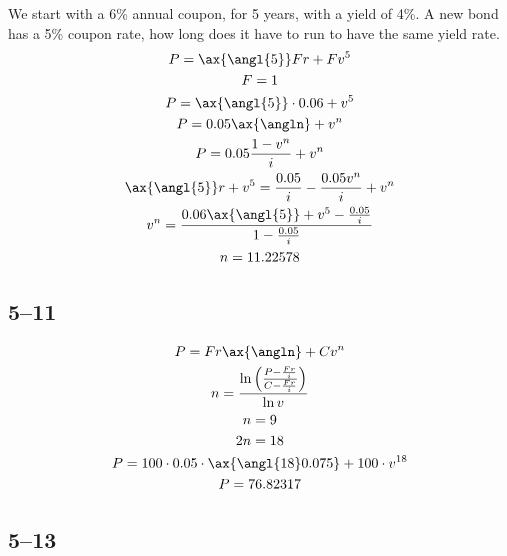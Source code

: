 \documentclass[a4paper, 12pt, reqno]{amsart}
\begin{document}
We start with a 6\% annual coupon, for 5 years, with a yield of 4\%. A new bond
has a 5\% coupon rate, how long does it have to run to have the same yield
rate.
\begin{equation}\nonumber
    \begin{gathered}
        P = \ax{\angl{5}} Fr + F v^5        \\
        F = 1                               \\
        P = \ax{\angl{5}} \cdot 0.06 + v^5           \\
        P = 0.05 \ax{\angln} + v^n          \\
        P = 0.05 \frac{1 - v^n}{i} + v^n          \\
        \ax{\angl{5}} r + v^5 = \frac{0.05}{i} - \frac{0.05v^n}{i} + v^n    \\
        v^n = \frac{0.06\ax{\angl{5}} + v^5 - \frac{0.05}{i}}{1
            - \frac{0.05}{i}}   \\
        n = 11.22578
    \end{gathered}
\end{equation}

\subsection*{5--11}

\begin{equation}\nonumber
    \begin{gathered}
        P = Fr\ax{\angln} + C v^n           \\
        n = \frac{\ln \left( \frac{P - \frac{Fr}{i}}{C 
            - \frac{Fr}{i}}\right)}{\ln v}  \\
        n = 9                               \\
        2n = 18                             \\
        P = 100 \cdot 0.05 \cdot \ax{\angl{18}0.075} + 100 \cdot v^{18}    \\
        P = 76.82317
    \end{gathered}
\end{equation}

\subsection*{5--13}
\end{document}
